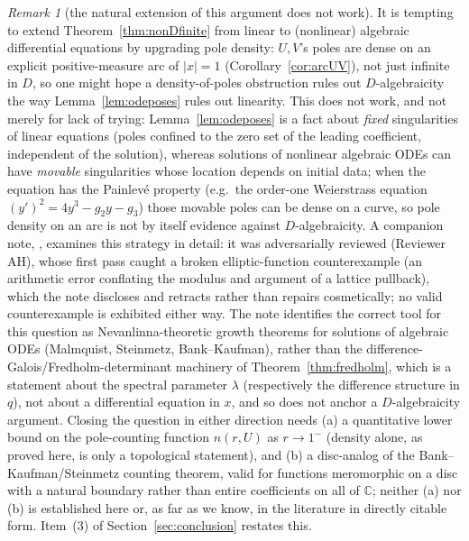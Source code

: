 \documentclass[11pt]{article}
\theoremstyle{plain}
\theoremstyle{definition}
\theoremstyle{remark}
\newtheorem{remark}[theorem]{Remark}
\newcommand{\C}{\mathbb{C}}
\theoremstyle{plain}\newtheorem*{maintheorem}{Main Theorem}
\begin{document}
\begin{remark}[the natural extension of this argument does not work]\label{rem:nonDalgebraic}
It is tempting to extend Theorem~\ref{thm:nonDfinite} from linear to (nonlinear) algebraic
differential equations by upgrading pole density: $U,V$'s poles are dense on an explicit
positive-measure arc of $|x|=1$ (Corollary~\ref{cor:arcUV}), not just infinite in $D$, so one might
hope a density-of-poles obstruction rules out $D$-algebraicity the way Lemma~\ref{lem:odeposes} rules
out linearity. This does not work, and not merely for lack of trying: Lemma~\ref{lem:odeposes} is a
fact about \emph{fixed} singularities of linear equations (poles confined to the zero set of the
leading coefficient, independent of the solution), whereas solutions of nonlinear algebraic ODEs can
have \emph{movable} singularities whose location depends on initial data; when the equation has the
Painlev\'e property (e.g.\ the order-one Weierstrass equation $(y')^2=4y^3-g_2y-g_3$) those movable
poles can be dense on a curve, so pole density on an arc is not by itself evidence against
$D$-algebraicity. A companion note, \cite[]{Bonfioli2026P4}, examines this strategy in detail: it
was adversarially reviewed (Reviewer AH), whose first pass caught a broken elliptic-function
counterexample (an arithmetic error conflating the modulus and argument of a lattice pullback), which
the note discloses and retracts rather than repairs cosmetically; no valid counterexample is exhibited
either way. The note identifies the correct tool for this question as Nevanlinna-theoretic growth
theorems for solutions of algebraic ODEs (Malmquist, Steinmetz, Bank--Kaufman), rather than the
difference-Galois/Fredholm-determinant machinery of Theorem~\ref{thm:fredholm}, which is a statement
about the spectral parameter $\lambda$ (respectively the difference structure in $q$), not about a
differential equation in $x$, and so does not anchor a $D$-algebraicity argument. Closing the question
in either direction needs (a) a quantitative lower bound on the pole-counting function $n(r,U)$ as
$r\to1^-$ (density alone, as proved here, is only a topological statement), and (b) a disc-analog of
the Bank--Kaufman/Steinmetz counting theorem, valid for functions meromorphic on a disc with a
natural boundary rather than entire coefficients on all of $\C$; neither (a) nor (b) is established
here or, as far as we know, in the literature in directly citable form. Item~(3) of
Section~\ref{sec:conclusion} restates this.
\end{remark}
\end{document}
